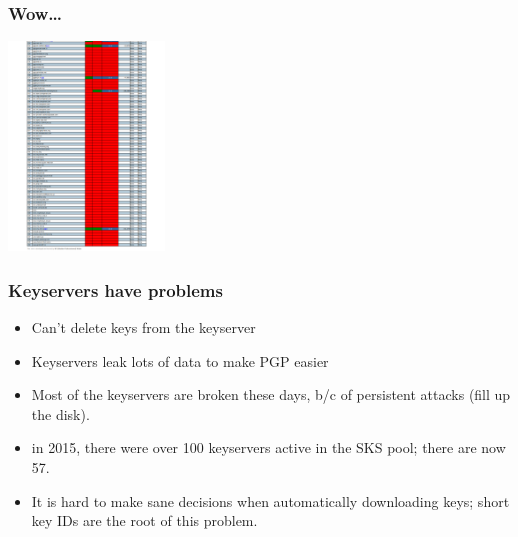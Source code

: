 \documentclass[aspectratio=1610,bigger,utf8]{beamer}
\begin{document}
\begin{frame}
	\frametitle{Wow\ldots}
	\begin{center}
		\includegraphics[height=210px]{sks-4}
	\end{center}
\end{frame}
\begin{frame}
	\frametitle{Keyservers have problems}
	\begin{itemize}
		\item Can't delete keys from the keyserver
		\item Keyservers leak lots of data to make PGP easier
		\item Most of the keyservers are broken these days, b/c of
			persistent attacks (fill up the disk).
		\item in 2015, there were over 100 keyservers active in the
			SKS pool; there are now 57.
		\item It is hard to make sane decisions when automatically
			downloading keys; short key IDs are the root of this
			problem.
	\end{itemize}
\end{frame}
\end{document}
